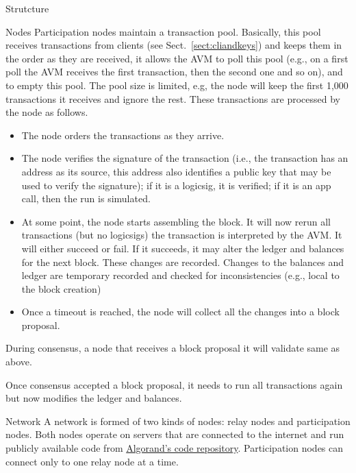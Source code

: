 \documentclass[10pt,a4paper]{article}
\begin{document}
\begin{section}{Strutcture}
\begin{subsection}{Nodes}
Participation nodes maintain a transaction pool. Basically, this pool receives transactions
from clients (see Sect.~\ref{sect:cliandkeys}) and keeps them in the order as they are 
received, it allows the AVM to poll this pool (e.g., on a first poll the AVM receives 
the first transaction, then the second one and so on), and to empty this pool. 
The pool size is limited, e.g, the node will keep the first 1,000 transactions it receives 
and ignore the rest.
These transactions are processed by the node as follows.
\begin{itemize}
    \item The node orders the transactions as they arrive.
    \item The node verifies the signature of the transaction (i.e., the transaction has an 
    address as its source, this address also identifies a public key that may be used to 
    verify the signature); if it is a logicsig, it is verified; if it is an app call, then
    the run is simulated.
    \item At some point, the node starts assembling the block. It will now rerun all transactions
    (but no logicsigs) the transaction is interpreted by the AVM. It will either succeed or
    fail. If it succeeds, it may alter the ledger and balances for the next block. These 
    changes are recorded. Changes to the balances and ledger are temporary recorded and
    checked for inconsistencies (e.g., local to the block creation)
    \item Once a timeout is reached, the node will collect all the changes into a block 
    proposal. 
\end{itemize}

During consensus, a node that receives a block proposal it will validate same as above.

Once consensus accepted a block proposal, it needs to run all transactions again
but now modifies the ledger and balances. 


\end{subsection}    
\begin{subsection}{Network}\label{sect:network}
A network is formed of two kinds of nodes: {\sf relay nodes}
and {\sf participation nodes}. 
Both nodes operate on servers that are connected to the internet and run publicly
available code from \href{https://github.com/algorand/go-algorand}{Algorand's code repository}.
Participation nodes can connect only to one relay node at a time.


\end{subsection}
\end{section}
\end{document}
